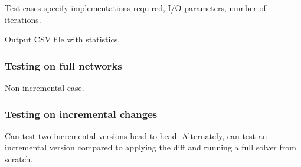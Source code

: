 Test cases specify implementations required, I/O parameters, number of iterations.

Output CSV file with statistics.

\subsubsection{Testing on full networks}

Non-incremental case.

\subsubsection{Testing on incremental changes}

Can test two incremental versions head-to-head. Alternately, can test an incremental version compared to applying the diff and running a full solver from scratch.